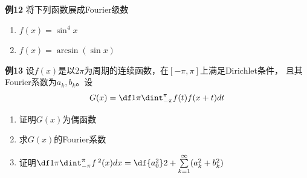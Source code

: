 \begin{frame}
	\linespread{1.2}
	\begin{exampleblock}{{\bf 例12}\hfill}
		将下列函数展成Fourier级数
		\begin{enumerate}
		  \item $f(x)=\sin^4x$
		  \item $f(x)=\arcsin(\sin x)$
		\end{enumerate}
	\end{exampleblock}
\end{frame}

\begin{frame}
	\linespread{1.2}
	\begin{exampleblock}{{\bf 例13}\hfill}
		设$f(x)$是以$2\pi$为周期的连续函数，在$[-\pi,\pi]$上满足Dirichlet条件，
		且其Fourier系数为$a_k,b_k$。设
		$$G(x)=\df1{\pi}\dint_{-\pi}^{\pi}f(t)f(x+t)dt$$
		\vspace{-1em}
		\begin{enumerate}
		  \item 证明$G(x)$为偶函数
		  \item 求$G(x)$的Fourier系数
		  \item 证明$\df1{\pi}\dint_{-\pi}^{\pi}f\,^2(x)dx=\df{a_0^2}2+
		  \sum\limits_{k=1}^{\infty}(a_k^2+b_k^2)$
		\end{enumerate}
	\end{exampleblock}
\end{frame}


% 
